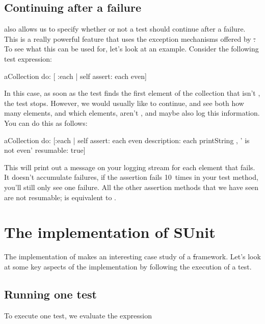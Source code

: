 \documentclass[a4paper,10pt,twoside]{book}
\begin{document}
\subsection{Continuing after a failure}
\sunit also allows us to specify whether or not a test should continue after a failure.  This is a really
powerful feature that uses the exception mechanisms offered
by \st.  To see what this can be used for, let's look at an
example. Consider the following test expression:
\begin{code}{}
aCollection do: [ :each | self assert: each even]
\end{code}
In this case, as soon as the test finds the first element of the collection that isn't
, the test stops. 
However, we would usually like to
continue, and see both how many elements, and which elements, aren't
, and maybe also log this information.  You can do this
as follows:
\begin{code}{}
aCollection do:
	[:each |
	self
		assert: each even
		description: each printString , ' is not even'
		resumable: true]
\end{code}
This will print out a message on your logging stream for each element
that fails.  It doesn't accumulate failures, \ie if the assertion
fails 10~times in your test method, you'll still only see one failure.
All the other assertion methods that we have seen are not resumable;
 is equivalent to .
\section{The implementation of SUnit}

The implementation of \sunit makes an interesting case study of a \st framework.
Let's look at some key aspects of the implementation by following the
execution of a test.
\subsection{Running one test}

To execute one test, we evaluate the expression
\end{document}
